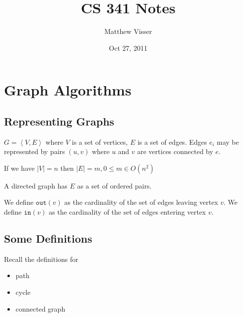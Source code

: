 \documentclass[12pt]{article}
\begin{document}
\title{CS 341 Notes}
\author{Matthew Visser}
\date{Oct 27, 2011}
\maketitle

\section{Graph Algorithms}

\subsection{Representing Graphs}

$G = \left<V,E\right>$ where $V$ is a set of vertices, $E$ is a set of edges.
Edges $e_i$ may be represented by pairs $(u,v)$ where $u$ and $v$ are vertices
connected by $e$.

If we have $|V| = n$ then $|E| = m, 0 \le m \in O(n^2)$

A directed graph has $E$ as a set of ordered pairs.

We define $\texttt{out}(v)$ as the cardinality of the set of edges leaving
vertex $v$.  We define $\texttt{in}(v)$ as the cardinality of the set of edges
entering vertex $v$.

\subsection{Some Definitions}

Recall the definitions for
\begin{itemize}
	\item path
	\item cycle
	\item connected graph
\end{itemize}
\end{document}
